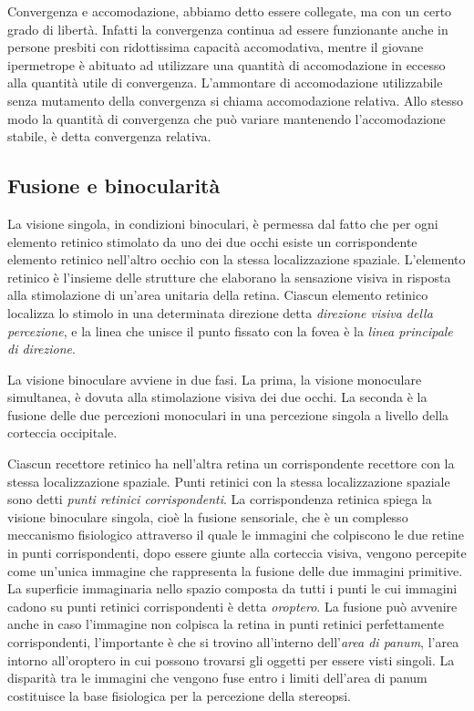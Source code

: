 Convergenza e accomodazione, abbiamo detto essere collegate, ma con un certo grado di libertà. Infatti la convergenza continua ad essere funzionante anche in persone presbiti con ridottissima capacità accomodativa, mentre il giovane ipermetrope è abituato ad utilizzare una quantità di accomodazione in eccesso alla quantità utile di convergenza. L’ammontare di accomodazione utilizzabile senza mutamento della convergenza si chiama accomodazione relativa. Allo stesso modo la quantità di convergenza che può variare mantenendo l’accomodazione stabile, è detta convergenza relativa\cite{bib18}.



\subsection{Fusione e binocularità}

La visione singola, in condizioni binoculari, è permessa dal fatto che per ogni elemento retinico stimolato da uno dei due occhi esiste un corrispondente elemento retinico nell’altro occhio con la stessa localizzazione spaziale. L’elemento retinico è l’insieme delle strutture che elaborano la sensazione visiva in risposta alla stimolazione di un’area unitaria della retina. Ciascun elemento retinico localizza lo stimolo in una determinata direzione detta \emph{direzione visiva della percezione}, e la linea che unisce il punto fissato con la fovea è la \emph{linea principale di direzione}.

La visione binoculare avviene in due fasi. La prima, la visione monoculare simultanea, è dovuta alla stimolazione visiva dei due occhi. La seconda è la fusione delle due percezioni monoculari in una percezione singola a livello della corteccia occipitale.

Ciascun recettore retinico ha nell’altra retina un corrispondente recettore con la stessa localizzazione spaziale. Punti retinici con la stessa localizzazione spaziale sono detti \emph{punti retinici corrispondenti}. La corrispondenza retinica spiega la visione binoculare singola, cioè la fusione sensoriale, che è un complesso meccanismo fisiologico attraverso il quale le immagini che colpiscono le due retine in punti corrispondenti, dopo essere giunte alla corteccia visiva, vengono percepite come un’unica immagine che rappresenta la fusione delle due immagini primitive. La superficie immaginaria nello spazio composta da tutti i punti le cui immagini cadono su punti retinici corrispondenti è detta \emph{oroptero}. La fusione può avvenire anche in caso l’immagine non colpisca la retina in punti retinici perfettamente corrispondenti, l’importante è che si trovino all’interno dell’\emph{area di panum}, l’area intorno all’oroptero in cui possono trovarsi gli oggetti per essere visti singoli. La disparità tra le immagini che vengono fuse entro i limiti dell’area di panum costituisce la base fisiologica per la percezione della stereopsi\cite{bib18}.

